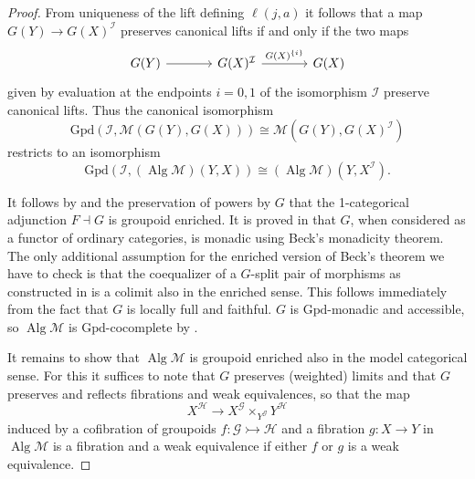 \documentclass[a4paper]{article}
\theoremstyle{remark}
\theoremstyle{definition}
\begin{document}
\begin{proof}
  From uniqueness of the lift defining $\ell(j, a)$ it follows that a map $G(Y) \rightarrow G(X)^\mathcal{I}$ preserves canonical lifts if and only if the two maps
  \begin{equation}
    \begin{tikzcd}[column sep=large]
      G(Y) \arrow[r] & G(X)^\mathcal{I} \arrow[r, "G(X)^{\{i\}}"] & G(X)
    \end{tikzcd}
  \end{equation}
  given by evaluation at the endpoints $i = 0, 1$ of the isomorphism $\mathcal{I}$ preserve canonical lifts.
  Thus the canonical isomorphism
  \begin{equation}
    \mathrm{Gpd}(\mathcal{I}, \mathcal{M}(G(Y), G(X))) \cong \mathcal{M}(G(Y), G(X)^\mathcal{I})
  \end{equation}
  restricts to an isomorphism
  \begin{equation}
    \mathrm{Gpd}(\mathcal{I}, (\operatorname{Alg} \mathcal{M})(Y, X)) \cong (\operatorname{Alg} \mathcal{M})(Y, X^\mathcal{I}).
  \end{equation}

  It follows by \cite[theorem 4.85]{basic-concepts-of-enriched-category-theory} and the preservation of powers by $G$ that the 1-categorical adjunction $F \dashv G$ is groupoid enriched.
  It is proved in \cite{algebraic-models} that $G$, when considered as a functor of ordinary categories, is monadic using Beck's monadicity theorem.
  The only additional assumption for the enriched version of Beck's theorem \cite[theorem II.2.1]{enriched-kan-extensions} we have to check is that the coequalizer of a $G$-split pair of morphisms as constructed in \cite{algebraic-models} is a colimit also in the enriched sense.
  This follows immediately from the fact that $G$ is locally full and faithful.
  $G$ is $\mathrm{Gpd}$-monadic and accessible, so $\operatorname{Alg} \mathcal{M}$ is $\mathrm{Gpd}$-cocomplete by \cite[theorem 3.8]{two-dimensional-monad-theory}.

  It remains to show that $\operatorname{Alg} \mathcal{M}$ is groupoid enriched also in the model categorical sense.
  For this it suffices to note that $G$ preserves (weighted) limits and that $G$ preserves and reflects fibrations and weak equivalences, so that the map
  \begin{equation}
    X^\mathcal{H} \rightarrow X^\mathcal{G} \times_{Y^\mathcal{G}} Y^\mathcal{H}
  \end{equation}
  induced by a cofibration of groupoids $f : \mathcal{G} \rightarrowtail \mathcal{H}$ and a fibration $g : X \rightarrow Y$ in $\operatorname{Alg} \mathcal{M}$ is a fibration and a weak equivalence if either $f$ or $g$ is a weak equivalence.
\end{proof}
\end{document}
